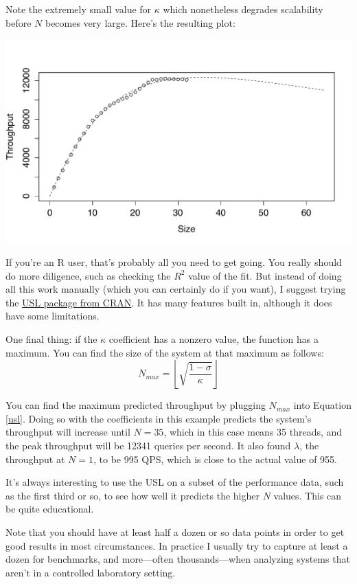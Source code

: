 \documentclass{vivid_layout}
\begin{document}
Note the extremely small value for $\kappa$ which nonetheless degrades
scalability before $N$ becomes very large. Here's the resulting plot:
\begin{center}
\includegraphics[width=.85\linewidth]{scalability/cisco}
\end{center}

If you're an R user, that's probably all you need to get going. You really
should do more diligence, such as checking the $R^2$ value of the fit. But
instead of doing all this work manually (which you can certainly do if you
want), I suggest trying the
\href{https://cran.r-project.org/web/packages/usl/}{USL package from CRAN}. It
has many features built in, although it does have some limitations.

One final thing: if the $\kappa$ coefficient has a nonzero value, the function
has a maximum. You can find the size of the system at that maximum as follows:
\begin{equation}
N_{max} = \left \lfloor \sqrt{\frac{1-\sigma}{\kappa}} \right \rfloor
\label{n_max}
\end{equation}

You can find the maximum predicted throughput by plugging $N_{max}$
into Equation \ref{usl}. Doing so with the coefficients in this example
predicts the system's throughput will increase until $N=35$, which in this case
means 35 threads, and the peak throughput will be 12341 queries per second. It
also found $\lambda$, the throughput at $N=1$, to be 995 QPS, which is close to
the actual value of 955.

It's always interesting to use the USL on a subset of the performance data, such
as the first third or so, to see how well it predicts the higher $N$ values.
This can be quite educational.

Note that you should have at least half a dozen or so data points in order to
get good results in most circumstances. In practice I usually try to capture at
least a dozen for benchmarks, and more---often thousands---when analyzing
systems that aren't in a controlled laboratory setting.
\end{document}

